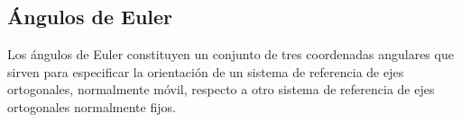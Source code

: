 \subsection*{Ángulos de Euler}

Los ángulos de Euler constituyen un conjunto de tres coordenadas angulares que
sirven para especificar la orientación de un sistema de referencia de ejes
ortogonales, normalmente móvil, respecto a otro sistema de referencia de ejes
ortogonales normalmente fijos.